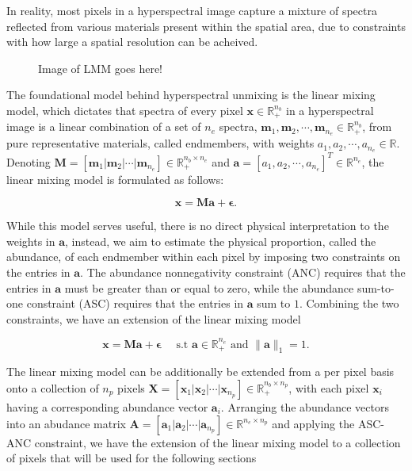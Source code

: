 In reality, most pixels in a hyperspectral image capture a mixture of spectra reflected from various materials present within the spatial area, due to constraints with how large a spatial resolution can be acheived. 

\begin{figure}[h]
    \caption{Image of LMM goes here!}
    \label{fig:figure2}
\end{figure}


The foundational model behind hyperspectral unmixing is the linear mixing model, which dictates that spectra of every pixel $\mathbf{x} \in \mathbb{R}_+^{n_b}$ in a hyperspectral image is a linear combination of a set of $n_e$ spectra, $\mathbf{m} _1, \mathbf{m} _2, \cdots, \mathbf{m} _{n_e} \in \mathbb{R}_+^{n_b}$, from pure representative materials, called endmembers, with weights $a_1, a_2, \cdots, a_{n_e} \in \mathbb{R}$. Denoting $\mathbf{M} = [\mathbf{m} _1 | \mathbf{m} _2 | \cdots |\mathbf{m} _{n_e}] \in \mathbb{R}_+^{n_b \times n_e}$ and $\mathbf{a} = [a_1, a_2, \cdots ,a_{n_e}]^T \in \mathbb{R}^{n_e}$, the linear mixing model is formulated as follows:

\begin{equation}
    \label{lmm:model}
    \mathbf{x} = \mathbf{M} \mathbf{a} + \mathbf{\epsilon}.
\end{equation}

While this model serves useful, there is no direct physical interpretation to the weights in $\mathbf{a}$, instead, we aim to estimate the physical proportion, called the abundance, of each endmember within each pixel by imposing two constraints on the entries in $\mathbf{a}$. The abundance nonnegativity constraint (ANC) requires that the entries in $\mathbf{a}$ must be greater than or equal to zero, while the abundance sum-to-one constraint (ASC) requires that the entries in $\mathbf{a}$ sum to $1$. Combining the two constraints, we have an extension of the linear mixing model

\begin{equation}
    \label{lmm:abund-lmm}
    \mathbf{x} = \mathbf{M} \mathbf{a} + \mathbf{\epsilon} \quad \text{ s.t } \mathbf{a} \in \mathbb{R}_+^{n_e} \text{ and } \|\mathbf{a}\|_1 = 1.
\end{equation}

The linear mixing model can be additionally be extended from a per pixel basis onto a collection of $n_p$ pixels $\mathbf{X} = [\mathbf{x}_1 | \mathbf{x}_2 | \cdots | \mathbf{x}_{n_p}] \in \mathbb{R}_ +^{n_b \times n_p}$, with each pixel $\mathbf{x}_i$ having a corresponding abundance vector $\mathbf{a}_i$. Arranging the abundance vectors into an abudance matrix $\mathbf{A} = [\mathbf{a}_1 | \mathbf{a}_2 | \cdots | \mathbf{a}_{n_p}] \in \mathbb{R}^{n_e \times n_p}$ and applying the ASC-ANC constraint, we have the extension of the linear mixing model to a collection of pixels that will be used for the following sections

